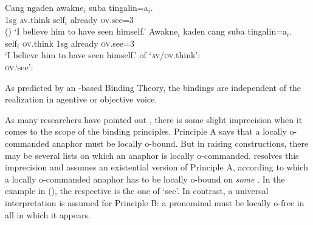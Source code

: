 \documentclass[output=paper,biblatex,babelshorthands,newtxmath,draftmode,colorlinks,citecolor=brown]{langscibook}
\begin{document}
\eal
\ex 
\gll Cang ngaden awakne$_i$ suba tingalin=a$_i$.\\
    1sg \textsc{av}.think self$_i$ already \textsc{ov}.see=3\\\hfill()
\glt `I believe him to have seen himself.'
\ex
\gll Awakne$_i$ kaden cang suba tingalin=a$_i$.\\
     self$_i$   \textsc{ov}.think 1sg already \textsc{ov}.see=3\\
\glt `I believe him to have seen himself.'
\ex \argst of `\textsc{av}/\textsc{ov}.think':\\
\ex \textsc{ov}.`see':\\
\zl

\noindent
As predicted by an \argst-based Binding Theory, the bindings are independent of the realization in
agentive or objective voice.

\largerpage[2]
As many researchers have pointed out \parencites[Section~5]{NB96a}[Section~20.4.2]{Mueller99a}, there is some slight imprecision when it comes to the scope of the
binding principles. Principle A says that a locally o-commanded anaphor must be locally o-bound. But in raising
constructions, there may be several lists on which an anaphor is locally
o-commanded. \citet{Wechsler99a} resolves this imprecision and assumes an existential version of
Principle A, according to which a locally o-commanded anaphor has to be locally o-bound on
\emph{some} \argst. In the example in (), the respective \argstl is the one of `see'. In
contrast, a universal interpretation is assumed for Principle B: a pronominal must be locally o-free
in all \argstls in which it appears.
\end{document}
